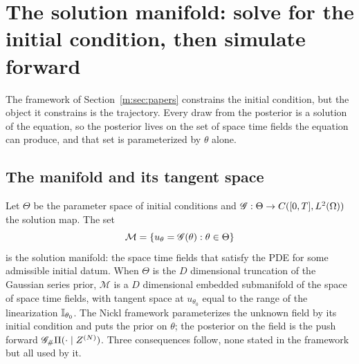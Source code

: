 \section{The solution manifold: solve for the initial condition, then simulate forward}\label{m:sec:manifold}

The framework of Section~\ref{m:sec:papers} constrains the initial condition, but the object it constrains is the trajectory. Every draw from the posterior is a solution of the equation, so the posterior lives on the set of space time fields the equation can produce, and that set is parameterized by $\theta$ alone.

\subsection{The manifold and its tangent space}

Let $\Theta$ be the parameter space of initial conditions and $\mathscr{G}:\Theta\to C([0,T],L^2(\Omega))$ the solution map. The set
\begin{equation}\label{m:eq:manifold}
\mathcal M=\{u_\theta=\mathscr{G}(\theta):\theta\in\Theta\}
\end{equation}
is the solution manifold: the space time fields that satisfy the PDE for some admissible initial datum. When $\Theta$ is the $D$ dimensional truncation of the Gaussian series prior, $\mathcal M$ is a $D$ dimensional embedded submanifold of the space of space time fields, with tangent space at $u_{\theta_0}$ equal to the range of the linearization $\mathbb{I}_{\theta_0}$. The Nickl framework parameterizes the unknown field by its initial condition and puts the prior on $\theta$; the posterior on the field is the push forward $\mathscr{G}_\#\Pi(\cdot\mid Z^{(N)})$. Three consequences follow, none stated in the framework but all used by it.


